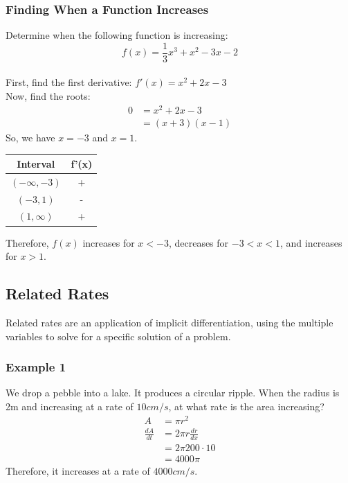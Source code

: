 \documentclass{article}
\begin{document}
\subsubsection{Finding When a Function Increases}
Determine when the following function is increasing:
$$f(x) = \frac{1}{3}x^3 + x^2 - 3x - 2$$
\\
First, find the first derivative: $f'(x) = x^2 + 2x - 3$\\
Now, find the roots:
\begin{align*}
    0 & = x^2 + 2x - 3\\
    & = (x+3) (x-1)
\end{align*}
So, we have $x = -3$ and $x = 1$.
\begin{center}
    \begin{tabular}{ c|c }
    Interval & f'(x)\\
    \hline
    $(-\infty, -3)$ & +\\
    $(-3, 1)$ & -\\
    $(1, \infty)$ & +
    \end{tabular}
\end{center}
Therefore, $f(x)$ increases for $x < -3$, decreases for $-3 < x < 1$, and increases for $x > 1$.
\subsection{Related Rates}
Related rates are an application of implicit differentiation, using the multiple variables to solve for a specific solution of a problem.
\subsubsection{Example 1}
We drop a pebble into a lake. It produces a circular ripple. When the radius is 2m and increasing at a rate of $10cm/s$, at what rate is the area increasing?\\
\begin{align*}
    A & = \pi r^2\\
    \frac{dA}{dt} & = 2 \pi  r \frac{dr}{dx}\\
    & = 2 \pi 200 \cdot 10\\
    & = 4000 \pi
\end{align*}
Therefore, it increases at a rate of $4000 cm/s$.
\end{document}
